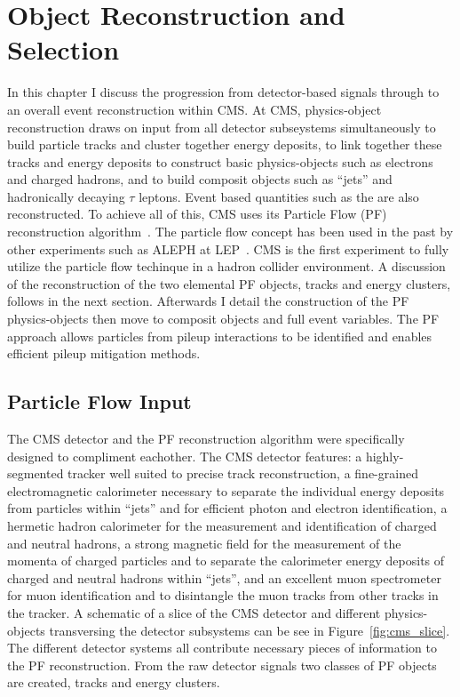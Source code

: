 \chapter{Object Reconstruction and Selection}
\label{sec:obj_reconstruction}

In this chapter I discuss the progression from detector-based signals through to an
overall event reconstruction within CMS. At CMS, physics-object reconstruction draws
on input from all detector subseystems simultaneously to build particle tracks
and cluster together energy deposits, to link together these tracks and energy
deposits to construct basic physics-objects such as electrons and charged
hadrons, and to build composit objects such as ``jets'' and hadronically decaying
$\tau$ leptons. Event based quantities such as the \etvecmiss are also reconstructed.
To achieve all of this, CMS uses its Particle Flow (PF) reconstruction 
algorithm~\cite{Sirunyan:2017ulk}. The particle flow concept has been used in the 
past by other experiments such as ALEPH at LEP~\cite{PF-ALEPH}. CMS is the first
experiment to fully utilize the particle flow techinque in a hadron collider environment.
A discussion of the reconstruction of the two elemental PF objects, tracks and energy
clusters, follows in the next section. Afterwards I detail the construction of 
the PF physics-objects then move to composit objects and full event variables.
The PF approach allows particles from pileup interactions to be identified 
and enables efficient pileup mitigation methods.

\section{Particle Flow Input}
The CMS detector and the PF reconstruction algorithm were specifically designed to
compliment eachother. The CMS detector features: a highly-segmented tracker well
suited to precise track reconstruction, a fine-grained electromagnetic calorimeter necessary
to separate the individual energy deposits from particles within ``jets'' and
for efficient photon and electron identification, a hermetic hadron 
calorimeter for the measurement and identification of charged and neutral hadrons, 
a strong magnetic field for the measurement of the momenta of charged particles and to
separate the calorimeter energy deposits of charged and neutral hadrons within ``jets'', and 
an excellent muon spectrometer for muon identification and to disintangle the muon
tracks from other tracks in the tracker. A schematic of a slice of the CMS detector
and different physics-objects transversing the detector subsystems can be see in
Figure~\ref{fig:cms_slice}. The different detector systems all contribute
necessary pieces of information to the PF reconstruction. From the raw detector
signals two classes of PF objects are created, tracks and energy clusters.

